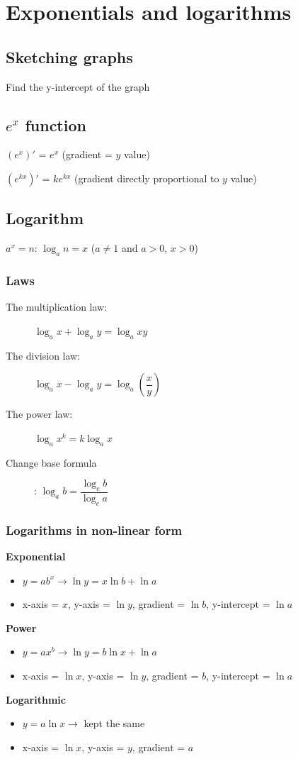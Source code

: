 \documentclass[A4paper]{article}
\begin{document}
	\pagebreak

	\section{Exponentials and logarithms}
	\subsection{Sketching graphs}
	Find the y-intercept of the graph

	\subsection{$e^x$ function}
	\begin{description}
		\item $(e^x)'$ = $e^x$ (gradient = $y$ value)
		\item $(e^{kx})'$ = $ke^{kx}$ (gradient directly proportional to $y$ value)
	\end{description}

	\subsection{Logarithm}
	$a^x = n$: $\log_a n = x$ ($a\neq1$ and $a>0$, $x>0$)
	\subsubsection{Laws}
	\begin{description}
		\item[The multiplication law:] $\log_a x + \log_a y = \log_a xy$
		\item[The division law:] $\log_a x - \log_a y = \log_a (\dfrac{x}{y})$
		\item[The power law:] $\log_a x^k = k\log_a x$
		\item[Change base formula]: $\log_a b = \dfrac{\log_c b}{\log_c a}$
	\end{description}

	\subsubsection{Logarithms in non-linear form}
	\textbf{Exponential}
	\begin{itemize}
		\item $y=ab^x\rightarrow\ln y = x\ln b + \ln a$
		\item x-axis = $x$, y-axis = $\ln y$, gradient = $\ln b$, y-intercept = $\ln a$
	\end{itemize}
	\textbf{Power}
	\begin{itemize}
		\item $y=ax^b\rightarrow\ln y = b\ln x + \ln a$
		\item x-axis = $\ln x$, y-axis = $\ln y$, gradient = $b$, y-intercept = $\ln a$
	\end{itemize}
	\textbf{Logarithmic}
	\begin{itemize}
		\item $y=a\ln x\rightarrow$ kept the same
		\item x-axis = $\ln x$, y-axis = $y$, gradient = $a$
	\end{itemize}
\end{document}
